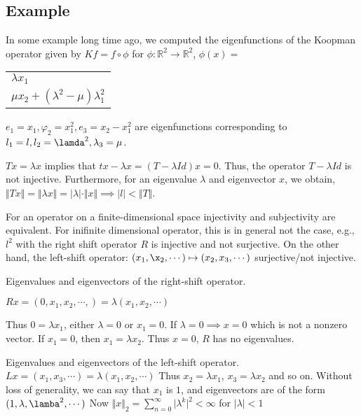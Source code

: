 \documentclass[11pt]{article}
\def\R{\mathbb{R}}
\begin{document}
\subsection{Example}
\label{sec:org026715a}
In some example long time ago, we computed the eigenfunctions of the Koopman
operator given by \(Kf = f \circ \phi\) for \(\phi \colon \R^2 \rightarrow
   \R^2\), \(\phi(x)=\)

\begin{center}
\begin{tabular}{l}
\(\lambda x_1\)\\
\(\mu x_2 + (\lambda^2 - \mu)\lambda_1^2\)\\
\end{tabular}
\end{center}

\(e_1 = x_1, \varphi_2 = x_1^2, e_3 = x_2 - x_1^2\) are eigenfunctions
corresponding to \(l_1 = l, l_2 = \lamda^2, \lambda_3 = \mu\).

\(Tx = \lambda x\) implies that \(tx - \lambda x = (T - \lambda Id) x = 0\).
Thus, the operator \(T - \lambda Id\) is not injective. Furthermore, for an
eigenvalue \(\lambda\) and eigenvector \(x\), we obtain,\(\Vert T x \Vert = \Vert
   \lambda x \Vert = \vert \lambda \vert \cdot \Vert x \Vert \implies \vert l
   \vert < \Vert T \Vert\).

For an operator on a finite-dimensional space injectivity and subjectivity
are equivalent. For inifinite dimensional operator, this is in general not
the case, e.g., \(l^2\) with the right shift operator \(R\) is injective and not
surjective. On the other hand, the left-shift operator: \((x_1, \x_2, \cdots)
   \mapsto (x_2, x_3, \cdots)\) surjective/not injective.

Eigenvalues and eigenvectors of the right-shift operator.

\(Rx = (0, x_1, x_2, \cdots,) = \lambda(x_1, x_2, \cdots)\)

Thus \(0 = \lambda x_1\), either \(\lambda = 0\) or \(x_1 = 0\). If \(\lambda = 0
   \implies x = 0\) which is not a nonzero vector. If \(x_1 = 0\), then \(x_1 =
   \lambda x_2\). Thus \(x = 0\), \(R\) has no eigenvalues.

Eigenvalues and eigenvectors of the left-shift operator. \(Lx = (x_1, x_3,
   \cdots) = \lambda(x_1, x_2, \cdots)\) Thus \(x_2 = \lambda x_1\), \(x_3 = \lambda
   x_2\) and so on. Without loss of generality, we can say that \(x_1\) is \(1\), and
eigenvectors are of the form \((1, \lambda, \lamba^2, \cdots)\) Now \(\Vert x
   \Vert_2 = \sum_{n = 0}^{\infty} \vert \lambda^k \vert^2 < \infty\) for \(\vert
   \lambda\vert < 1\)
\end{document}
